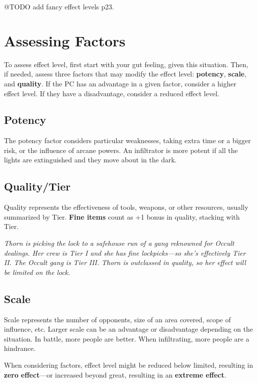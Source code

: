 \documentclass[11pt,fleqn,a5paper]{book}
\begin{document}
@TODO add fancy effect levels p23.

\section{Assessing Factors}

To assess effect level, first start with your gut feeling, given this situation. Then, if needed, assess three factors that may modify the effect level: \textbf{potency}, \textbf{scale}, and \textbf{quality}. If the PC has an advantage in a given factor, consider a higher effect level. If they have a disadvantage, consider a reduced effect level.

\subsection{Potency}

The potency factor considers particular weaknesses, taking extra time or a bigger risk, or the influence of arcane powers. An infiltrator is more potent if all the lights are extinguished and they move about in the dark.

\subsection{Quality/Tier}

Quality represents the effectiveness of tools, weapons, or other resources, usually summarized by Tier. \textbf{Fine items} count as +1 bonus in quality, stacking with Tier.

\emph{Thorn is picking the lock to a safehouse run of a gang reknowned for Occult dealings. Her crew is Tier I and she has fine lockpicks---so she’s effectively Tier II. The Occult gang is Tier III. Thorn is outclassed in quality, so her effect will be limited on the lock.}

\subsection{Scale}

Scale represents the number of opponents, size of an area covered, scope of influence, etc. Larger scale can be an advantage or disadvantage depending on the situation. In battle, more people are better. When infiltrating, more people are a hindrance.

When considering factors, effect level might be reduced below limited, resulting in \textbf{zero effect}---or increased beyond great, resulting in an \textbf{extreme effect}.
\end{document}
